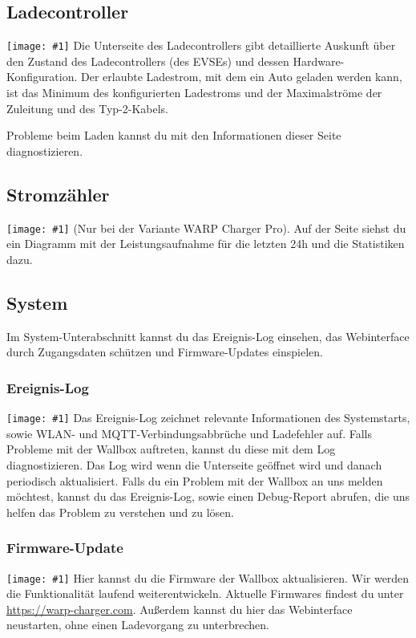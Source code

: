 \documentclass[a4paper,10pt]{article}
\newcommand{\gfx}[1]{\texttt{[image: \#1]}}
\begin{document}
\begin{multicols*}{2}
	\subsection{Ladecontroller}
	\gfx{./img_warp2/resized/web_evse}
	Die Unterseite des Ladecontrollers gibt detaillierte Auskunft über den Zustand
	des Ladecontrollers (des EVSEs) und dessen Hardware-Konfiguration. Der
	erlaubte Ladestrom, mit dem ein Auto geladen werden kann, ist das Minimum des
	konfigurierten Ladestroms und der Maximalströme der Zuleitung und des Typ-2-Kabels.

	Probleme beim Laden kannst du mit den Informationen dieser
	Seite diagnostizieren.

	\subsection{Stromzähler}
	\gfx{./img_warp2/resized/web_meter}
	(Nur bei der Variante WARP Charger Pro). Auf der Seite
	siehst du ein Diagramm mit der Leistungsaufnahme für die letzten 24h und die
	Statistiken dazu.

	\subsection{System}
	Im System-Unterabschnitt kannst du das Ereignis-Log einsehen, das Webinterface durch Zugangsdaten schützen und Firmware-Updates einspielen.
	\subsubsection{Ereignis-Log}
	\gfx{./img_warp2/resized/web_event_log}
	Das Ereignis-Log zeichnet relevante Informationen des Systemstarts, sowie WLAN- und MQTT-Verbindungsabbrüche und Ladefehler auf.
	Falls Probleme mit der Wallbox auftreten, kannst du diese mit dem Log diagnostizieren.
	Das Log wird wenn die Unterseite geöffnet wird und danach periodisch aktualisiert.
	Falls du ein Problem mit der Wallbox an uns melden möchtest, kannst du das Ereignis-Log,
	sowie einen Debug-Report abrufen, die uns helfen das Problem zu verstehen und zu lösen.

	\subsubsection{Firmware-Update}
	\gfx{./img_warp2/resized/web_firmware_update}
	Hier kannst du die Firmware der Wallbox aktualisieren. Wir werden die Funktionalität
	laufend weiterentwickeln. Aktuelle Firmwares findest du unter \url{https://warp-charger.com}.
	Außerdem kannst du hier das Webinterface neustarten, ohne einen Ladevorgang zu unterbrechen.


\end{multicols*}
\end{document}
